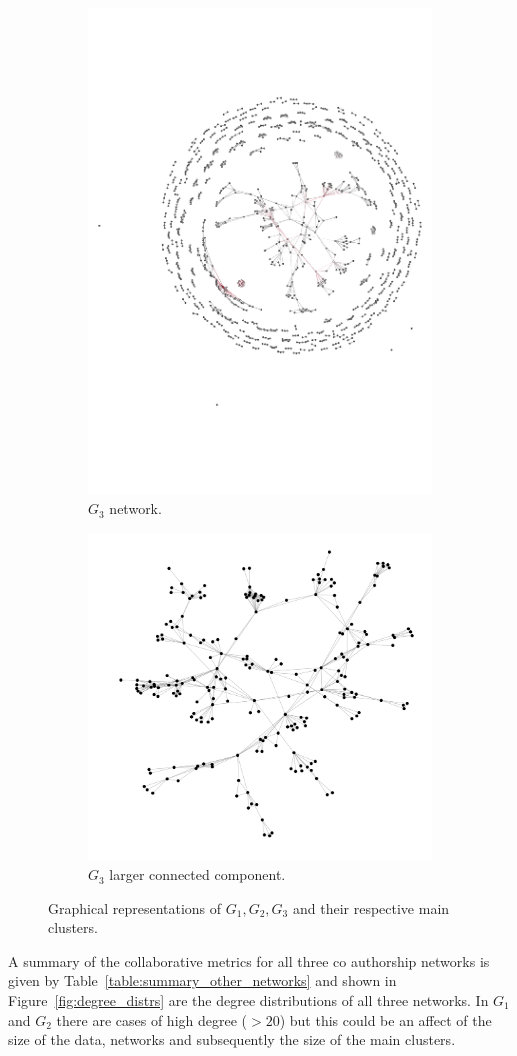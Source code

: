 \documentclass{article}
\theoremstyle{definition}
\begin{document}
\begin{figure}[!hbtp]
    \begin{subfigure}{.45\textwidth}\centering
        \includegraphics[width=.54\textwidth]{./assets/anarchy_network.pdf}
        \caption{\(G_3\) network.}\label{fig:g_three}
     \end{subfigure}
     \begin{subfigure}{.45\textwidth}\centering
        \includegraphics[width=.54\textwidth]{./assets/anarchy_network_cluster.pdf}
        \caption{\(G_3\) larger connected component.}\label{fig:g_three_cluster}
     \end{subfigure}
     \caption{Graphical representations of \(G_1, G_2, G_3\) and their respective
     main clusters.}
\end{figure}

A summary of the collaborative metrics for all three co authorship networks is given by
Table~\ref{table:summary_other_networks} and shown in Figure~\ref{fig:degree_distrs}
are the degree distributions of all three networks. In \(G_1\) and \(G_2\) there
are cases of high degree (\(> 20\)) but this could be an affect of the size of
the data, networks and subsequently the size of the main clusters.
\end{document}
